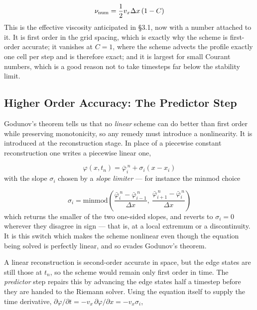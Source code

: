 \documentclass[notoc]{tufte-handout}
\begin{document}
\begin{equation}
\nu_{\rm num} = \frac{1}{2}v_x \Delta x \left( 1 - C \right)
\end{equation}
%
This is the effective viscosity anticipated in \S 3.1, now with a number attached to it. It is first order in the grid spacing, which is exactly why the scheme is first-order accurate; it vanishes at $C = 1$, where the scheme advects the profile exactly one cell per step and is therefore exact; and it is largest for small Courant numbers, which is a good reason not to take timesteps far below the stability limit. 

\subsection{Higher Order Accuracy: The Predictor Step}

Godunov's theorem tells us that no {\it linear} scheme can do better than first order while preserving monotonicity, so any remedy must introduce a nonlinearity. It is introduced at the reconstruction stage. In place of a piecewise constant reconstruction one writes a piecewise linear one,

\begin{equation}
\varphi(x,t_n) = \bar{\varphi}_i^{\,n} + \sigma_i \left( x - x_i \right)
\end{equation}
%
with the slope $\sigma_i$ chosen by a {\it slope limiter} --- for instance the minmod choice

\begin{equation}
\sigma_i = \mathrm{minmod}\left( \frac{\bar{\varphi}_i^{\,n} - \bar{\varphi}_{i-1}^{\,n}}{\Delta x},~ \frac{\bar{\varphi}_{i+1}^{\,n} - \bar{\varphi}_i^{\,n}}{\Delta x} \right)
\end{equation}
%
which returns the smaller of the two one-sided slopes, and reverts to $\sigma_i = 0$ wherever they disagree in sign --- that is, at a local extremum or a discontinuity. It is this switch which makes the scheme nonlinear even though the equation being solved is perfectly linear, and so evades Godunov's theorem.

A linear reconstruction is second-order accurate in space, but the edge states are still those at $t_n$, so the scheme would remain only first order in time. The {\it predictor} step repairs this by advancing the edge states half a timestep before they are handed to the Riemann solver. Using the equation itself to supply the time derivative, $\partial \varphi / \partial t = -v_x \, \partial \varphi / \partial x = -v_x \sigma_i$,
\end{document}
